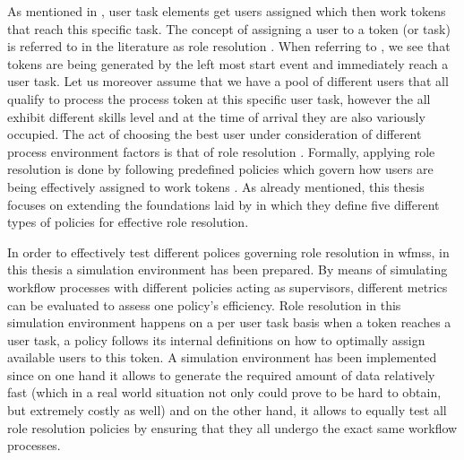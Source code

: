 As mentioned in , user task elements get users assigned which then work tokens that reach this specific task. The concept of assigning a user to a token (or task) is referred to in the literature as role resolution \citep{Zeng2005,Cheng2000}. When referring to , we see that tokens are being generated by the left most start event and immediately reach a user task. Let us moreover assume that we have a pool of different users that all qualify to process the process token at this specific user task, however the all exhibit different skills level and at the time of arrival they are also variously occupied. The act of choosing the best user under consideration of different process environment factors is that of role resolution \citep{Zeng2005}. Formally, applying role resolution is done by following predefined policies which govern how users are being effectively assigned to work tokens \citep{Zeng2005}. As already mentioned, this thesis focuses on extending the foundations laid by \citet{Zeng2005} in which they define five different types of policies for effective role resolution.

In order to effectively test different polices governing role resolution in \glspl{wfms}, in this thesis a simulation environment has been prepared. By means of simulating workflow processes with different policies acting as supervisors, different metrics can be evaluated to assess one policy's efficiency. Role resolution in this simulation environment happens on a per user task basis \ie when a token reaches a user task, a policy follows its internal definitions on how to optimally assign available users to this token. A simulation environment has been implemented since on one hand it allows to generate the required amount of data relatively fast (which in a real world situation not only could prove to be hard to obtain, but extremely costly as well) and on the other hand, it allows to equally test all role resolution policies by ensuring that they all undergo the exact same workflow processes.
